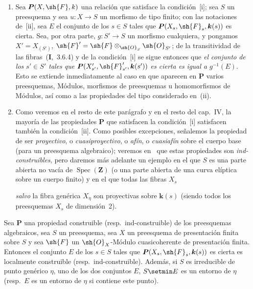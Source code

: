 \begin{remarks}[9.2.2]
\begin{enumerate}[label=(\roman*)]
  \item Sea $\boldsymbol{P}(X,\sh{F},k)$ una relación que satisface la condición~[i]; sea $S$ un preesquema y sea $u:X\to S$ un morfismo de tipo finito; con las notaciones de~[ii], sea $E$ el conjunto de los $s\in S$ tales que $\boldsymbol{P}(X_s,\sh{F}_s,\boldsymbol{k}(s))$ es cierta.
Sea, por otra parte, $g:S'\to S$ un morfismo cualquiera, y pongamos $X'=X_{(S')}$, $\sh{F}'=\sh{F}\otimes_{\sh{O}_S}\sh{O}_{S'}$; de la transitividad de las fibras~(\textbf{I},~3.6.4) y de la condición~[i] se sigue entonces que \emph{el conjunto de los $s'\in S'$ tales que $\boldsymbol{P}(X'_{s'},\sh{F}'_{s'},\boldsymbol{k}(s'))$ es cierta es igual a $g^{-1}(E)$}.
Esto se extiende inmediatamente al caso en que aparecen en $\boldsymbol{P}$ varios preesquemas, Módulos, morfismos de preesquemas u homomorfismos de Módulos, así como a las propiedades del tipo considerado en~(ii).

  \item Como veremos en el resto de este parágrafo y en el resto del cap.~IV, la mayoría de las propiedades $\boldsymbol{P}$ que satisfacen la condición~[i] satisfacen también la condición~[ii].
Como posibles excepciones, señalemos la propiedad de ser \emph{proyectivo}, o \emph{cuasiproyectivo}, o \emph{afín}, o \emph{cuasiafín} sobre el cuerpo base (para un preesquema algebraico); veremos en~ que estas propiedades son \emph{ind-construibles}, pero daremos más adelante un ejemplo en el que $S$ es una parte abierta no vacía de $\operatorname{Spec}(\mathbf{Z})$ (o una parte abierta de una curva elíptica sobre un cuerpo finito) y en el que todas las fibras $X_s$

\emph{salvo} la fibra genérica $X_\eta$ son proyectivas sobre $\boldsymbol{k}(s)$ (siendo todos los preesquemas $X_s$ de dimensión~2).
\end{enumerate}
\end{remarks}

\begin{proposition}[9.2.3]
\label{IV.9.2.3}
Sea $\boldsymbol{P}$ una propiedad construible \textnormal{(resp.}\ ind-construible\textnormal{)} de los preesquemas algebraicos, sea $S$ un preesquema, sea $X$ un preesquema de presentación finita sobre $S$ y sea $\sh{F}$ un $\sh{O}_X$-Módulo cuasicoherente de presentación finita.
Entonces el conjunto $E$ de los $s\in S$ tales que $\boldsymbol{P}(X_s,\sh{F}_s,\boldsymbol{k}(s))$ es cierta es localmente construible \textnormal{(resp.}\ ind-construible\textnormal{)}.
Además, si $S$ es irreducible de punto genérico $\eta$, uno de los dos conjuntos $E$, $S\setmin E$ es un entorno de $\eta$ \textnormal{(resp.}\ $E$ es un entorno de $\eta$ si contiene este punto\textnormal{)}.
\end{proposition}

